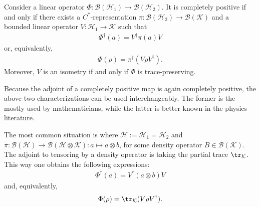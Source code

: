     \begin{theorem}[Stinespring]\label{operators:stinespring}
        Consider a linear operator $\Phi:\mathcal{B}(\mathcal{H}_1)\rightarrow\mathcal{B}(\mathcal{H}_2)$. It is completely positive if and only if there exists a $C^*$-representation $\pi:\mathcal{B}(\mathcal{H}_2)\rightarrow\mathcal{B}(\mathcal{K})$ and a bounded linear operator $V:\mathcal{H}_1\rightarrow\mathcal{K}$ such that
        \begin{gather}
            \Phi^\dagger(a) = V^\dag\pi(a)V
        \end{gather}
        or, equivalently,
        \begin{gather}
            \Phi(\rho) = \pi^\dagger(V\rho V^\dagger).
        \end{gather}
        Moreover, $V$ is an isometry if and only if $\Phi$ is trace-preserving.
    \end{theorem}
    \begin{remark}
        Because the adjoint of a completely positive map is again completely positive, the above two characterizations can be used interchangeably. The former is the mostly used by mathematicians, while the latter is better known in the physics literature.

        The most common situation is where $\mathcal{H}:=\mathcal{H}_1=\mathcal{H}_2$ and $\pi:\mathcal{B}(\mathcal{H})\rightarrow\mathcal{B}(\mathcal{H}\otimes\mathcal{K}):a\mapsto a\otimes b$, for some density operator $B\in\mathcal{B}(\mathcal{K})$. The adjoint to tensoring by a density operator is taking the partial trace $\tr_\mathcal{K}$. This way one obtains the following expressions:
        \begin{gather}
            \Phi^\dagger(a) = V^\dag(a\otimes b)V
        \end{gather}
        and, equivalently,
        \begin{gather}
            \Phi(\rho) = \tr_\mathcal{K}(V\rho V^\dagger).
        \end{gather}
    \end{remark}

